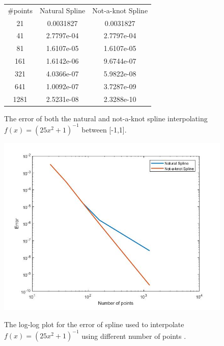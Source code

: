 \begin{figure}[H]
 \centering
\begin{tabular}{ |c || c|c |}
 \hline
\#points  & Natural Spline & Not-a-knot Spline \\ 
  	
  \hhline{|=|=|=|}                           
   21  & 0.0031827    & 0.0031827	 \\
   41  & 2.7797e-04   & 2.7797e-04 \\
   81  & 1.6107e-05   & 1.6107e-05 \\
   161 & 1.6142e-06   & 9.6744e-07 \\
   321 & 4.0366e-07   & 5.9822e-08 \\
   641 & 1.0092e-07   & 3.7287e-09 \\   
   1281 & 2.5231e-08  & 2.3288e-10\\ 
 \hline
\end{tabular} 
  \caption{The error of both the natural and not-a-knot spline interpolating $f(x)=(25x^2+1)^{-1}$ between [-1,1]. }
   \label{tab:part_e}
\end{figure}


\begin{figure}[H]
 \centering  
   {\includegraphics[width=0.9\linewidth]{fig/prob2_error.jpg}}   
  \caption{The log-log plot for the error of spline used to interpolate  $f(x)=(25x^2+1)^{-1}$ using different number of points .}
   \label{fig:fig_error}
\end{figure} 
